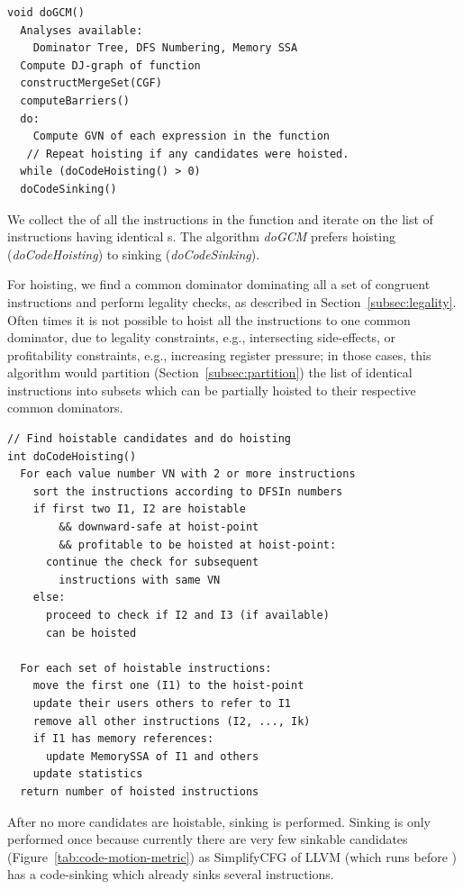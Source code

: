 \documentclass[sigplan,10pt,review,anonymous]{acmart}\settopmatter{printfolios=true,printccs=false,printacmref=false}
\begin{document}
\begin{verbatim}
void doGCM()
  Analyses available:
    Dominator Tree, DFS Numbering, Memory SSA
  Compute DJ-graph of function
  constructMergeSet(CGF)
  computeBarriers()
  do:
    Compute GVN of each expression in the function
   // Repeat hoisting if any candidates were hoisted.
  while (doCodeHoisting() > 0)
  doCodeSinking()
\end{verbatim}

We collect the \GVN{} of all the instructions in the function and iterate on the
list of instructions having identical \GVN{}s. The algorithm \emph{doGCM}
prefers hoisting (\emph{doCodeHoisting}) to sinking (\emph{doCodeSinking}).

For hoisting, we find a common dominator dominating all a set of congruent
instructions and perform legality checks, as described in
Section~\ref{subsec:legality}. Often times it is not possible to hoist all the
instructions to one common dominator, due to legality constraints, e.g.,
intersecting side-effects, or profitability constraints, e.g., increasing
register pressure; in those cases, this algorithm would partition
(Section~\ref{subsec:partition}) the list of identical instructions into subsets
which can be partially hoisted to their respective common dominators.

\begin{verbatim}
// Find hoistable candidates and do hoisting
int doCodeHoisting()
  For each value number VN with 2 or more instructions
    sort the instructions according to DFSIn numbers
    if first two I1, I2 are hoistable
        && downward-safe at hoist-point
        && profitable to be hoisted at hoist-point:
      continue the check for subsequent
        instructions with same VN
    else:
      proceed to check if I2 and I3 (if available)
      can be hoisted

  For each set of hoistable instructions:
    move the first one (I1) to the hoist-point
    update their users others to refer to I1
    remove all other instructions (I2, ..., Ik)
    if I1 has memory references:
      update MemorySSA of I1 and others
    update statistics
  return number of hoisted instructions
\end{verbatim}

After no more candidates are hoistable, sinking is performed. Sinking is only
performed once because currently there are very few sinkable candidates
(Figure~\ref{tab:code-motion-metric}) as SimplifyCFG of LLVM (which runs before
\GCM{}) has a code-sinking which already sinks several instructions.
\end{document}
